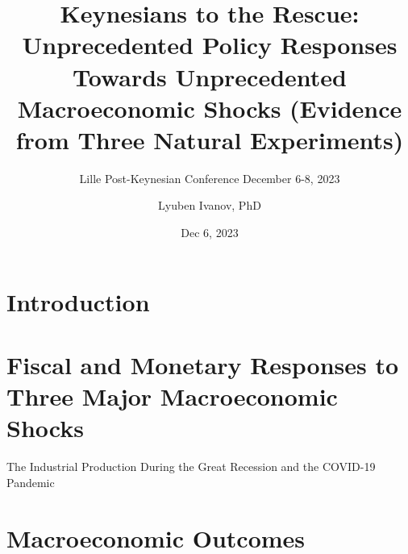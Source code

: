 

\title{Keynesians to the Rescue: Unprecedented Policy Responses Towards Unprecedented Macroeconomic Shocks (Evidence from Three Natural Experiments)}
\subtitle{Lille Post-Keynesian Conference 
\newline December 6-8, 2023 }
\date{Dec 6, 2023}
\author{Lyuben Ivanov, PhD}



\maketitle

\section{Introduction}

\section{Fiscal and Monetary Responses to Three Major Macroeconomic Shocks}

\begin{frame}{The Industrial Production During the Great Recession and the COVID-19 Pandemic}
	
\end{frame}


\section{Macroeconomic Outcomes}


